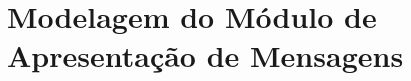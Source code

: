 %
%
%
%
%

%
%
%
%
%

\section{Modelagem do Módulo de Apresentação de Mensagens} \label{sec:messages}


